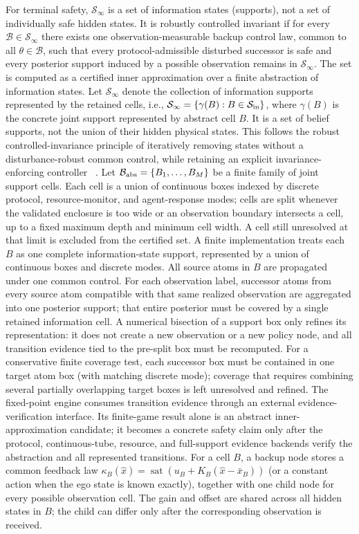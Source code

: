 \documentclass[letterpaper]{article} %
\begin{document}
For terminal safety, $\mathcal S_\infty$ is a set of information states
(supports), not a set of individually safe hidden states. It is robustly
controlled invariant if for every $\mathcal B\in\mathcal S_\infty$
there exists one observation-measurable backup control law, common to all
$\theta\in\mathcal B$, such that every protocol-admissible disturbed
successor is safe and every posterior support induced by a possible
observation remains in $\mathcal S_\infty$. The set is computed as a certified inner approximation over a finite
abstraction of information states. Let $\mathcal S_\infty$ denote the
collection of information supports represented by the retained cells, i.e.,
$\mathcal S_\infty=\{\gamma(B):B\in\mathcal S_{\rm in}\}$, where
$\gamma(B)$ is the concrete joint support represented by abstract cell $B$.
It is a set of belief supports, not the union of their hidden physical states. This follows the robust controlled-invariance
principle of iteratively removing states without a disturbance-robust common
control, while retaining an explicit invariance-enforcing controller
~\citep{brown2023computing,schafer2023scalable}. Let
$\mathcal B_{\rm abs}=\{B_1,\ldots,B_M\}$ be a finite family of joint support cells.
Each cell is a union of continuous boxes indexed by discrete protocol,
resource-monitor, and agent-response modes; cells are split whenever the
validated enclosure is too wide or an observation boundary intersects a cell,
up to a fixed maximum depth and minimum cell width. A cell still unresolved
at that limit is excluded from the certified set.
A finite implementation treats each $B$ as one complete information-state
support, represented by a union of continuous boxes and discrete modes. All
source atoms in $B$ are propagated under one common control. For each
observation label, successor atoms from every source atom compatible with
that same realized observation are aggregated into one posterior support;
that entire posterior must be covered by a single retained information cell.
A numerical bisection of a support box only refines its representation: it
does not create a new observation or a new policy node, and all transition
evidence tied to the pre-split box must be recomputed. For a conservative
finite coverage test, each successor box must be contained in one target
atom box (with matching discrete mode); coverage that requires combining
several partially overlapping target boxes is left unresolved and refined.
The fixed-point engine consumes transition evidence through an external
evidence-verification interface. Its finite-game result alone is an abstract
inner-approximation candidate; it becomes a concrete safety claim only after
the protocol, continuous-tube, resource, and full-support evidence backends
verify the abstraction and all represented transitions.
For a cell $B$, a backup node stores a common feedback law
$\kappa_B(\hat x)=\operatorname{sat}(u_B+K_B(\hat x-\bar x_B))$
(or a constant action when the ego state is known exactly), together with
one child node for every possible observation cell. The gain and offset are
shared across all hidden states in $B$; the child can differ only after the
corresponding observation is received.
\end{document}
